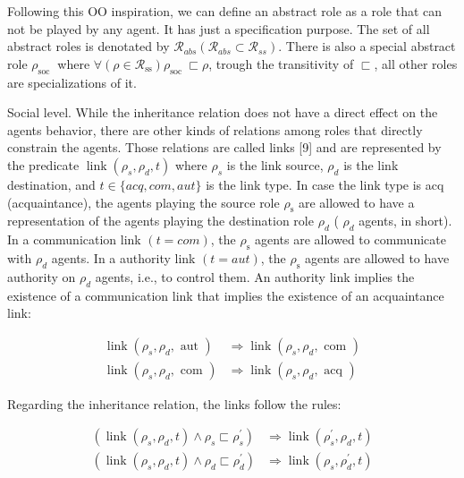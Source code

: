 \documentclass[10pt]{article}
\begin{document}
Following this $\mathrm{OO}$ inspiration, we can define an abstract role as a role that can not be played by any agent. It has just a specification purpose. The set of all abstract roles is denotated by $\mathcal{R}_{a b s}\left(\mathcal{R}_{a b s} \subset \mathcal{R}_{s s}\right)$. There is also a special abstract role $\rho_{\text {soc }}$ where $\forall\left(\rho \in \mathcal{R}_{\mathrm{ss}}\right) \rho_{\text {soc }} \sqsubset \rho$, trough the transitivity of $\sqsubset$, all other roles are specializations of it.

Social level. While the inheritance relation does not have a direct effect on the agents behavior, there are other kinds of relations among roles that directly constrain the agents. Those relations are called links [9] and are represented by the predicate $\operatorname{link}\left(\rho_{s}, \rho_{d}, t\right)$ where $\rho_{s}$ is the link source, $\rho_{d}$ is the link destination, and $t \in\{a c q, c o m, a u t\}$ is the link type. In case the link type is acq (acquaintance), the agents playing the source role $\rho_{\mathrm{s}}$ are allowed to have a representation of the agents playing the destination role $\rho_{d}$ ( $\rho_{d}$ agents, in short). In a communication link $(t=c o m)$, the $\rho_{\mathrm{s}}$ agents are allowed to communicate with $\rho_{d}$ agents. In a authority link $(t=a u t)$, the $\rho_{\mathrm{s}}$ agents are allowed to have authority on $\rho_{d}$ agents, i.e., to control them. An authority link implies the existence of a communication link that implies the existence of an acquaintance link:

$$
\begin{aligned}
\operatorname{link}\left(\rho_{s}, \rho_{d}, \text { aut }\right) & \Rightarrow \operatorname{link}\left(\rho_{s}, \rho_{d}, \text { com }\right) \\
\operatorname{link}\left(\rho_{s}, \rho_{d}, \text { com }\right) & \Rightarrow \operatorname{link}\left(\rho_{s}, \rho_{d}, \text { acq }\right)
\end{aligned}
$$

Regarding the inheritance relation, the links follow the rules:

$$
\begin{aligned}
\left(\operatorname{link}\left(\rho_{s}, \rho_{d}, t\right) \wedge \rho_{s} \sqsubset \rho_{s}^{\prime}\right) & \Rightarrow \operatorname{link}\left(\rho_{s}^{\prime}, \rho_{d}, t\right) \\
\left(\operatorname{link}\left(\rho_{s}, \rho_{d}, t\right) \wedge \rho_{d} \sqsubset \rho_{d}^{\prime}\right) & \Rightarrow \operatorname{link}\left(\rho_{s}, \rho_{d}^{\prime}, t\right)
\end{aligned}
$$
\end{document}
